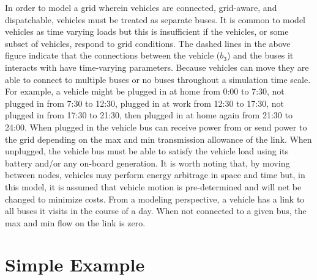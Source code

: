 \documentclass[12pt]{article}
\begin{document}
In order to model a grid wherein vehicles are connected, grid-aware, and dispatchable, vehicles must be treated as separate buses. It is common to model vehicles as time varying loads but this is insufficient if the vehicles, or some subset of vehicles, respond to grid conditions. The dashed lines in the above figure indicate that the connections between the vehicle ($b_3$) and the buses it interacts with have time-varying parameters. Because vehicles can move they are able to connect to multiple buses or no buses throughout a simulation time scale. For example, a vehicle might be plugged in at home from 0:00 to 7:30, not plugged in from 7:30 to 12:30, plugged in at work from 12:30 to 17:30, not plugged in from 17:30 to 21:30, then plugged in at home again from 21:30 to 24:00. When plugged in the vehicle bus can receive power from or send power to the grid depending on the max and min transmission allowance of the link. When unplugged, the vehicle bus must be able to satisfy the vehicle load using its battery and/or any on-board generation. It is worth noting that, by moving between nodes, vehicles may perform energy arbitrage in space and time but, in this model, it is assumed that vehicle motion is pre-determined and will net be changed to minimize costs. From a modeling perspective, a vehicle has a link to all buses it visits in the course of a day. When not connected to a given bus, the max and min flow on the link is zero.

\section*{Simple Example}






 
\end{document}
